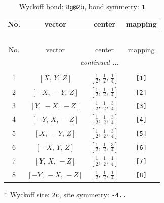 \documentclass[fleqn,8pt]{jsarticle}
\begin{document}
\begin{longtable}{cccc}
\caption{Wyckoff bond: {\tt 8g@2b}, bond symmetry: {\tt 1}}
 \\
 \hline \hline
No. & vector & center & mapping \\ \hline \endfirsthead

\multicolumn{3}{l}{\tablename\ \thetable{}} \\
 \hline \hline
No. & vector & center & mapping \\ \hline \endhead

 \hline \hline
\multicolumn{3}{r}{\footnotesize\it continued ...} \\ \endfoot

 \hline \hline
\multicolumn{3}{r}{} \\ \endlastfoot

1 & $\left[ X,\, Y,\, Z \right]$ & $\left[ \frac{1}{2},\, \frac{1}{2},\, \frac{1}{4} \right]$ & {\tt [1]} \\ \hline
2 & $\left[ - X,\, - Y,\, Z \right]$ & $\left[ \frac{1}{2},\, \frac{1}{2},\, \frac{1}{4} \right]$ & {\tt [2]} \\ \hline
3 & $\left[ Y,\, - X,\, - Z \right]$ & $\left[ \frac{1}{2},\, \frac{1}{2},\, \frac{3}{4} \right]$ & {\tt [3]} \\ \hline
4 & $\left[ - Y,\, X,\, - Z \right]$ & $\left[ \frac{1}{2},\, \frac{1}{2},\, \frac{3}{4} \right]$ & {\tt [4]} \\ \hline
5 & $\left[ X,\, - Y,\, Z \right]$ & $\left[ \frac{1}{2},\, \frac{1}{2},\, \frac{3}{4} \right]$ & {\tt [5]} \\ \hline
6 & $\left[ - X,\, Y,\, Z \right]$ & $\left[ \frac{1}{2},\, \frac{1}{2},\, \frac{3}{4} \right]$ & {\tt [6]} \\ \hline
7 & $\left[ Y,\, X,\, - Z \right]$ & $\left[ \frac{1}{2},\, \frac{1}{2},\, \frac{1}{4} \right]$ & {\tt [7]} \\ \hline
8 & $\left[ - Y,\, - X,\, - Z \right]$ & $\left[ \frac{1}{2},\, \frac{1}{2},\, \frac{1}{4} \right]$ & {\tt [8]} \\
\end{longtable}
* Wyckoff site: {\tt 2c}, site symmetry: {\tt -4..}
\renewcommand{\arraystretch}{1.2}
\end{document}
